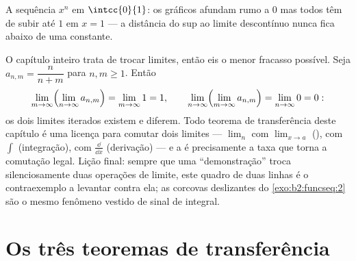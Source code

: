 \begin{omfigure}

{\small A sequência $x^n$ em $\intcc{0}{1}$: os gráficos afundam rumo a
$0$ mas todos têm de subir até $1$ em $x = 1$ --- a distância do sup ao
limite  descontínuo nunca fica abaixo de uma constante.}
\end{omfigure}

\begin{example}\label{ex:b2:funcseq:doublelimit}
O capítulo inteiro trata de trocar limites, então eis o
menor fracasso possível. Seja $a_{n,m} = \dfrac{n}{n+m}$ para
$n, m \geq 1$. Então
\[
\lim_{m\to\infty}\Bigl(\lim_{n\to\infty}a_{n,m}\Bigr)
= \lim_{m\to\infty} 1 = 1,
\qquad
\lim_{n\to\infty}\Bigl(\lim_{m\to\infty}a_{n,m}\Bigr)
= \lim_{n\to\infty} 0 = 0 :
\]
os dois limites iterados existem e diferem. Todo teorema de
transferência deste capítulo é uma licença para comutar dois limites ---
$\lim_n$ com $\lim_{x\to a}$ (), com $\int$
(integração), com $\frac{\dd}{\dd x}$ (derivação) ---
e a  é precisamente a taxa que torna a
comutação legal. Lição final: sempre que uma ``demonstração''
troca silenciosamente duas operações de limite, este quadro de duas linhas é
o contraexemplo a levantar contra ela; as corcovas deslizantes do
\cref{exo:b2:funcseq:2} são o mesmo fenômeno vestido de
sinal de integral.
\end{example}

\section{Os três teoremas de transferência}

